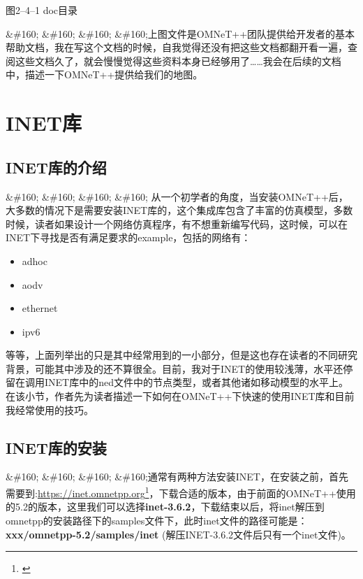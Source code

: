图2--4--1 doc目录

\&\#160; \&\#160; \&\#160; \&\#160;上图文件是OMNeT++团队提供给开发者的基本帮助文档，我在写这个文档的时候，自我觉得还没有把这些文档都翻开看一遍，查阅这些文档久了，就会慢慢觉得这些资料本身已经够用了{\ldots}{\ldots}我会在后续的文档中，描述一下OMNeT++提供给我们的地图。

\section{INET库}
\label{inet库}

\subsection{INET库的介绍}
\label{inet库的介绍}

\&\#160; \&\#160; \&\#160; \&\#160; 从一个初学者的角度，当安装OMNeT++后，大多数的情况下是需要安装INET库的，这个集成库包含了丰富的仿真模型，多数时候，读者如果设计一个网络仿真程序，有不想重新编写代码，这时候，可以在INET下寻找是否有满足要求的example，包括的网络有：

\begin{itemize}
\item adhoc

\item aodv

\item ethernet

\item ipv6

\end{itemize}

等等，上面列举出的只是其中经常用到的一小部分，但是这也存在读者的不同研究背景，可能其中涉及的还不算很全。目前，我对于INET的使用较浅薄，水平还停留在调用INET库中的ned文件中的节点类型，或者其他诸如移动模型的水平上。在该小节，作者先为读者描述一下如何在OMNeT++下快速的使用INET库和目前我经常使用的技巧。

\subsection{INET库的安装}
\label{inet库的安装}

\&\#160; \&\#160; \&\#160; \&\#160;通常有两种方法安装INET，在安装之前，首先需要到:\href{}{https:\slash \slash inet.omnetpp.org}\footnote{\href{}{}}，下载合适的版本，由于前面的OMNeT++使用的5.2的版本，这里我们可以选择\textbf{inet-3.6.2}，下载结束以后，将inet解压到omnetpp的安装路径下的samples文件下，此时inet文件的路径可能是：
\textbf{xxx\slash omnetpp-5.2\slash samples\slash inet}
(解压INET-3.6.2文件后只有一个inet文件)。

